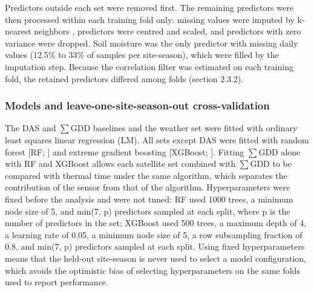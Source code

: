 \documentclass[
  british,
]{interact}
\begin{document}
Predictors outside each set were removed first. The remaining predictors
were then processed within each training fold only: missing values were
imputed by k-nearest neighbors \citep{Gower1971}, predictors were
centred and scaled, and predictors with zero variance were dropped. Soil
moisture was the only predictor with missing daily values (12.5\% to
33\% of samples per site-season), which were filled by the imputation
step. Because the correlation filter was estimated on each training
fold, the retained predictors differed among folds (section 2.3.2).

\subsubsection{Models and leave-one-site-season-out
cross-validation}\label{models-and-leave-one-site-season-out-cross-validation}

The DAS and \(\sum\)GDD baselines and the weather set were fitted with
ordinary least squares linear regression (LM). All sets except DAS were
fitted with random forest {[}RF; \citet{Breiman2001}{]} and extreme
gradient boosting {[}XGBoost; \citet{Chen2016}{]}. Fitting \(\sum\)GDD
alone with RF and XGBoost allows each satellite set combined with
\(\sum\)GDD to be compared with thermal time under the same algorithm,
which separates the contribution of the sensor from that of the
algorithm. Hyperparameters were fixed before the analysis and were not
tuned: RF used 1000 trees, a minimum node size of 5, and min(7, p)
predictors sampled at each split, where p is the number of predictors in
the set; XGBoost used 500 trees, a maximum depth of 4, a learning rate
of 0.05, a minimum node size of 5, a row subsampling fraction of 0.8,
and min(7, p) predictors sampled at each split. Using fixed
hyperparameters means that the held-out site-season is never used to
select a model configuration, which avoids the optimistic bias of
selecting hyperparameters on the same folds used to report performance.
\end{document}
